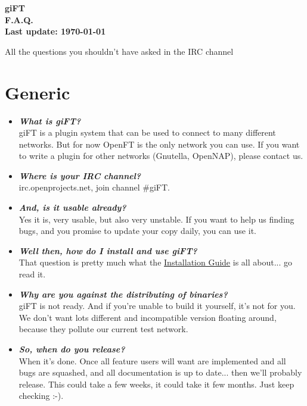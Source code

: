 \documentclass[10pt]{article}
\newcommand{\question}[1]{\item\textbf{\emph{#1}}}
\begin{document}
\begin{center}
\textsf{\textbf{\Huge{giFT} \\ \huge{F.A.Q.} \\
\normalsize{Last update: \today}}}
\end{center}

\begin{center}
All the questions you shouldn't have asked in the IRC channel
\end{center}

\tableofcontents

\setlength{\parskip}{1.4ex}

\section{Generic}
\begin{itemize}

\question {What is giFT?}\\
giFT is a plugin system that can be used to connect to many different networks.
But for now OpenFT is the only network you can use. If you want to write a
plugin for other networks (Gnutella, OpenNAP), please contact us. 

\question {Where is your IRC channel?}\\
irc.openprojects.net, join channel \#giFT. 

\question {And, is it usable already?}\\
Yes it is, very usable, but also very unstable. If you want to help us finding
bugs, and you promise to update your copy daily, you can use it.

\question {Well then, how do I install and use giFT?}\\
That question is pretty much what the
\href{http://gift.sourceforge.net/docs/?document=install.html}{Installation
Guide} is all about... go read it.

\question {Why are you against the distributing of binaries?}\\
giFT is not ready. And if you're unable to build it yourself, it's not for you.
We don't want lots different and incompatible version floating around, because
they pollute our current test network.

\question {So, when do you release?}\\
When it's done. Once all feature users will want are implemented and all bugs
are squashed, and all documentation is up to date... then we'll probably
release. This could take a few weeks, it could take it few months. Just keep
checking :-).


\end{itemize}
\end{document}
